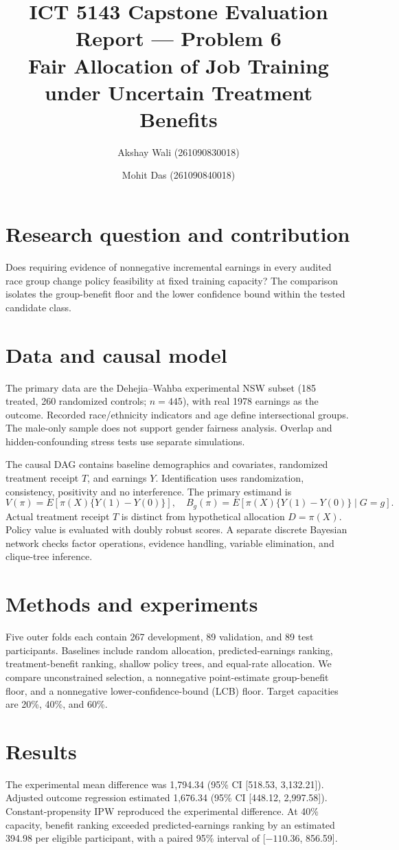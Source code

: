 \documentclass[10pt]{article}
\title{\vspace{-1.2em}ICT 5143 Capstone Evaluation Report — Problem 6\\
\large Fair Allocation of Job Training under Uncertain Treatment Benefits}
\author{Akshay Wali (261090830018) \and Mohit Das (261090840018)}
\date{}
\begin{document}
\maketitle
\section{Research question and contribution}
Does requiring evidence of nonnegative incremental earnings in every audited race group change policy feasibility at fixed training capacity? The comparison isolates the group-benefit floor and the lower confidence bound within the tested candidate class.

\section{Data and causal model}
The primary data are the Dehejia--Wahba experimental NSW subset (185 treated, 260 randomized controls; $n=445$), with real 1978 earnings as the outcome. Recorded race/ethnicity indicators and age define intersectional groups. The male-only sample does not support gender fairness analysis. Overlap and hidden-confounding stress tests use separate simulations.

The causal DAG contains baseline demographics and covariates, randomized treatment receipt $T$, and earnings $Y$. Identification uses randomization, consistency, positivity and no interference. The primary estimand is
\[
V(\pi)=E[\pi(X)\{Y(1)-Y(0)\}],\quad
B_g(\pi)=E[\pi(X)\{Y(1)-Y(0)\}\mid G=g].
\]
Actual treatment receipt $T$ is distinct from hypothetical allocation $D=\pi(X)$. Policy value is evaluated with doubly robust scores. A separate discrete Bayesian network checks factor operations, evidence handling, variable elimination, and clique-tree inference.

\section{Methods and experiments}
Five outer folds each contain 267 development, 89 validation, and 89 test participants. Baselines include random allocation, predicted-earnings ranking, treatment-benefit ranking, shallow policy trees, and equal-rate allocation. We compare unconstrained selection, a nonnegative point-estimate group-benefit floor, and a nonnegative lower-confidence-bound (LCB) floor. Target capacities are 20\%, 40\%, and 60\%.

\section{Results}
The experimental mean difference was 1,794.34 (95\% CI [518.53, 3,132.21]). Adjusted outcome regression estimated 1,676.34 (95\% CI [448.12, 2,997.58]). Constant-propensity IPW reproduced the experimental difference. At 40\% capacity, benefit ranking exceeded predicted-earnings ranking by an estimated 394.98 per eligible participant, with a paired 95\% interval of [$-110.36$, 856.59].
\end{document}
